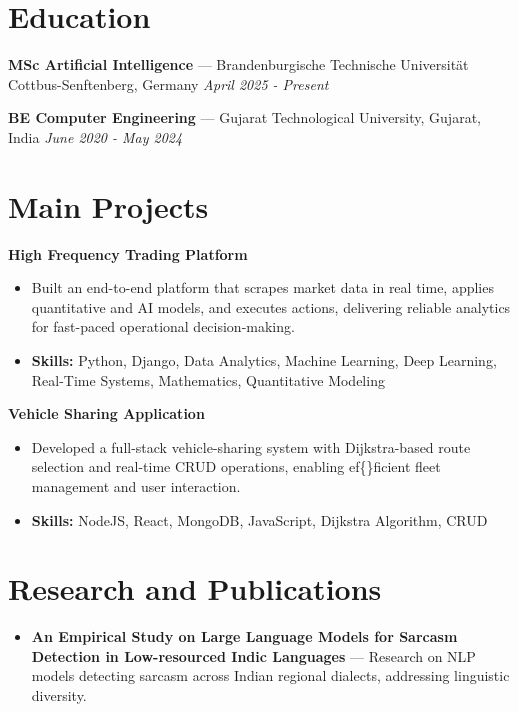 \documentclass[a4paper,10pt]{article}
\begin{document}
\section*{Education}
\textbf{MSc Artificial Intelligence} — Brandenburgische Technische Universität Cottbus-Senftenberg, Germany \hfill \textit{April 2025 - Present}\par
\vspace{1.5pt}
\textbf{BE Computer Engineering} — Gujarat Technological University, Gujarat, India \hfill \textit{June 2020 - May 2024}\par

\section*{Main Projects}
\textbf{High Frequency Trading Platform}\par
\vspace{1pt}
\begin{itemize}
  \item Built an end-to-end platform that scrapes market data in real time, applies quantitative and AI models, and executes actions, delivering reliable analytics for fast-paced operational decision-making.
  \item \textbf{Skills:} Python, Django, Data Analytics, Machine Learning, Deep Learning, Real-Time Systems, Mathematics, Quantitative Modeling
\end{itemize}
\vspace{3pt}
\textbf{Vehicle Sharing Application}\par
\vspace{1pt}
\begin{itemize}
  \item Developed a full-stack vehicle-sharing system with Dijkstra-based route selection and real-time CRUD operations, enabling ef\{\}ficient fleet management and user interaction.
  \item \textbf{Skills:} NodeJS, React, MongoDB, JavaScript, Dijkstra Algorithm, CRUD
\end{itemize}

\section*{Research and Publications}
\begin{itemize}
\item \textbf{An Empirical Study on Large Language Models for Sarcasm Detection in Low-resourced Indic Languages} — Research on NLP models detecting sarcasm across Indian regional dialects, addressing linguistic diversity.
\end{itemize}
\end{document}

